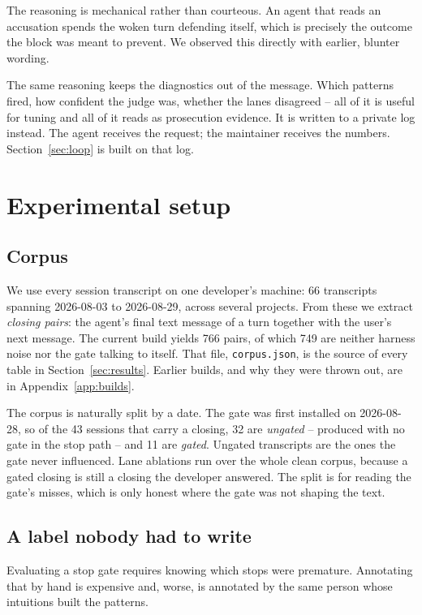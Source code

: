 The reasoning is mechanical rather than courteous. An agent that reads an
accusation spends the woken turn defending itself, which is precisely the
outcome the block was meant to prevent. We observed this directly with earlier,
blunter wording.

The same reasoning keeps the diagnostics out of the message. Which patterns
fired, how confident the judge was, whether the lanes disagreed -- all of it is
useful for tuning and all of it reads as prosecution evidence. It is written to
a private log instead. The agent receives the request; the maintainer receives
the numbers. Section~\ref{sec:loop} is built on that log.

\section{Experimental setup}
\label{sec:setup}

\subsection{Corpus}

We use every session transcript on one developer's machine: 66 transcripts
spanning 2026-08-03 to 2026-08-29, across several projects. From these we
extract \emph{closing pairs}: the agent's final text message of a turn together
with the user's next message. The current build yields 766 pairs, of which 749
are neither harness noise nor the gate talking to itself. That file,
\texttt{corpus.json}, is the source of every table in Section~\ref{sec:results}.
Earlier builds, and why they were thrown out, are in Appendix~\ref{app:builds}.

The corpus is naturally split by a date. The gate was first installed on
2026-08-28, so of the 43 sessions that carry a closing, 32 are \emph{ungated}
-- produced with no gate in the stop path -- and 11 are \emph{gated}.
Ungated transcripts are the ones the gate never influenced. Lane ablations
run over the whole clean corpus, because a gated closing is still a closing
the developer answered. The split is for reading the gate's misses, which is
only honest where the gate was not shaping the text.

\subsection{A label nobody had to write}

Evaluating a stop gate requires knowing which stops were premature. Annotating
that by hand is expensive and, worse, is annotated by the same person whose
intuitions built the patterns.

